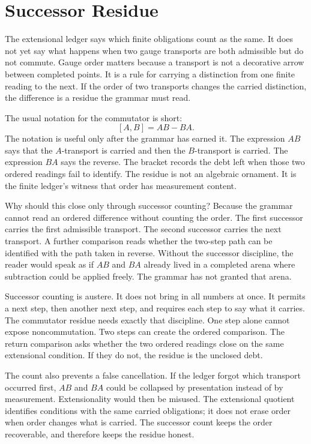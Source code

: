 \section{Successor Residue}

The extensional ledger says which finite obligations count as the same. It
does not yet say what happens when two gauge transports are both admissible
but do not commute. Gauge order matters because a transport is not a decorative
arrow between completed points. It is a rule for carrying a distinction from
one finite reading to the next. If the order of two transports changes the
carried distinction, the difference is a residue the grammar must read.

The usual notation for the commutator is short:
\[
  [A,B] = AB - BA .
\]
The notation is useful only after the grammar has earned it. The expression
\(AB\) says that the \(A\)-transport is carried and then the \(B\)-transport
is carried. The expression \(BA\) says the reverse. The bracket records the
debt left when those two ordered readings fail to identify. The residue is
not an algebraic ornament. It is the finite ledger's witness that order has
measurement content.

Why should this close only through successor counting? Because the grammar
cannot read an ordered difference without counting the order. The first
successor carries the first admissible transport. The second successor
carries the next transport. A further comparison reads whether the two-step
path can be identified with the path taken in reverse. Without the successor
discipline, the reader would speak as if \(AB\) and \(BA\) already lived in a
completed arena where subtraction could be applied freely. The grammar has
not granted that arena.

Successor counting is austere. It does not bring in all numbers at once. It
permits a next step, then another next step, and requires each step to say
what it carries. The commutator residue needs exactly that discipline. One
step alone cannot expose noncommutation. Two steps can create the ordered
comparison. The return comparison asks whether the two ordered readings close
on the same extensional condition. If they do not, the residue is the
unclosed debt.

The count also prevents a false cancellation. If the ledger forgot which
transport occurred first, \(AB\) and \(BA\) could be collapsed by presentation
instead of by measurement. Extensionality would then be misused. The
extensional quotient identifies conditions with the same carried obligations;
it does not erase order when order changes what is carried. The successor
count keeps the order recoverable, and therefore keeps the residue honest.

